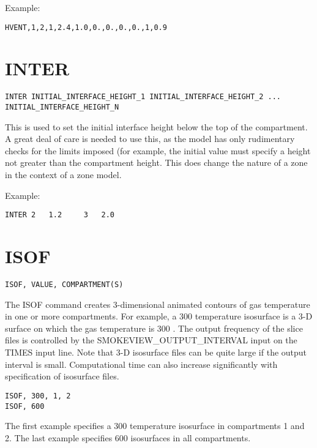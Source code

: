 Example:

\begin{lstlisting}
HVENT,1,2,1,2.4,1.0,0.,0.,0.,0.,1,0.9
\end{lstlisting}

\section{INTER}

\begin{lstlisting}
INTER INITIAL_INTERFACE_HEIGHT_1 INITIAL_INTERFACE_HEIGHT_2 ... INITIAL_INTERFACE_HEIGHT_N
\end{lstlisting}

This is used to set the initial interface height below the top of the compartment. A great deal of care is needed to use this, as the model has only rudimentary checks for the limits imposed (for example, the initial value must specify a height not greater than the compartment height. This does change the nature of a zone in the context of a zone model.

Example:

\begin{lstlisting}
INTER 2   1.2     3   2.0
\end{lstlisting}

\section{ISOF}

\begin{lstlisting}
ISOF, VALUE, COMPARTMENT(S)
\end{lstlisting}

The ISOF command creates 3-dimensional animated contours of gas temperature in one or more compartments.  For example, a 300 \degc temperature isosurface is a 3-D surface on which the gas temperature is 300 \degc. The output frequency of the slice files is controlled by the SMOKEVIEW\_OUTPUT\_INTERVAL input on the TIMES input line. Note that 3-D isosurface files can be quite large if the output interval is small. Computational time can also increase significantly with specification of isosurface files.

\begin{lstlisting}
ISOF, 300, 1, 2
ISOF, 600
\end{lstlisting}

The first example specifies a 300 \degc temperature isosurface in compartments 1 and 2.  The last example specifies 600 \degc isosurfaces in all compartments.

